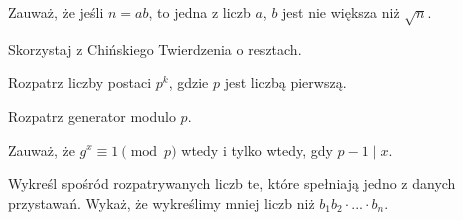 
\begin{hints_list}
	\item Zauważ, że jeśli $n = ab$, to jedna z liczb $a$, $b$ jest nie większa niż $\sqrt{n}$.
	\item Skorzystaj z Chińskiego Twierdzenia o resztach.
	\item Rozpatrz liczby postaci $p^k$, gdzie $p$ jest liczbą pierwszą.
	\item Rozpatrz generator modulo $p$.
	\item Zauważ, że $g^x \equiv 1 \pmod{p}$ wtedy i tylko wtedy, gdy $p - 1\mid x$. 
	\item Wykreśl spośród rozpatrywanych liczb te, które spełniają jedno z danych przystawań. Wykaż, że wykreślimy mniej liczb niż $b_1b_2\cdot ... \cdot b_n$.
\end{hints_list}